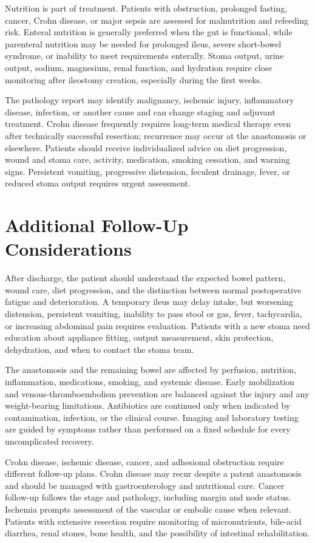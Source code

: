 Nutrition is part of treatment. Patients with obstruction, prolonged fasting, cancer, Crohn disease, or major sepsis are assessed for malnutrition and refeeding risk. Enteral nutrition is generally preferred when the gut is functional, while parenteral nutrition may be needed for prolonged ileus, severe short-bowel syndrome, or inability to meet requirements enterally. Stoma output, urine output, sodium, magnesium, renal function, and hydration require close monitoring after ileostomy creation, especially during the first weeks.

The pathology report may identify malignancy, ischemic injury, inflammatory disease, infection, or another cause and can change staging and adjuvant treatment. Crohn disease frequently requires long-term medical therapy even after technically successful resection; recurrence may occur at the anastomosis or elsewhere. Patients should receive individualized advice on diet progression, wound and stoma care, activity, medication, smoking cessation, and warning signs. Persistent vomiting, progressive distension, feculent drainage, fever, or reduced stoma output requires urgent assessment.

\section*{Additional Follow-Up Considerations}
After discharge, the patient should understand the expected bowel pattern, wound care, diet progression, and the distinction between normal postoperative fatigue and deterioration. A temporary ileus may delay intake, but worsening distension, persistent vomiting, inability to pass stool or gas, fever, tachycardia, or increasing abdominal pain requires evaluation. Patients with a new stoma need education about appliance fitting, output measurement, skin protection, dehydration, and when to contact the stoma team.

The anastomosis and the remaining bowel are affected by perfusion, nutrition, inflammation, medications, smoking, and systemic disease. Early mobilization and venous-thromboembolism prevention are balanced against the injury and any weight-bearing limitations. Antibiotics are continued only when indicated by contamination, infection, or the clinical course. Imaging and laboratory testing are guided by symptoms rather than performed on a fixed schedule for every uncomplicated recovery.

Crohn disease, ischemic disease, cancer, and adhesional obstruction require different follow-up plans. Crohn disease may recur despite a patent anastomosis and should be managed with gastroenterology and nutritional care. Cancer follow-up follows the stage and pathology, including margin and node status. Ischemia prompts assessment of the vascular or embolic cause when relevant. Patients with extensive resection require monitoring of micronutrients, bile-acid diarrhea, renal stones, bone health, and the possibility of intestinal rehabilitation.

